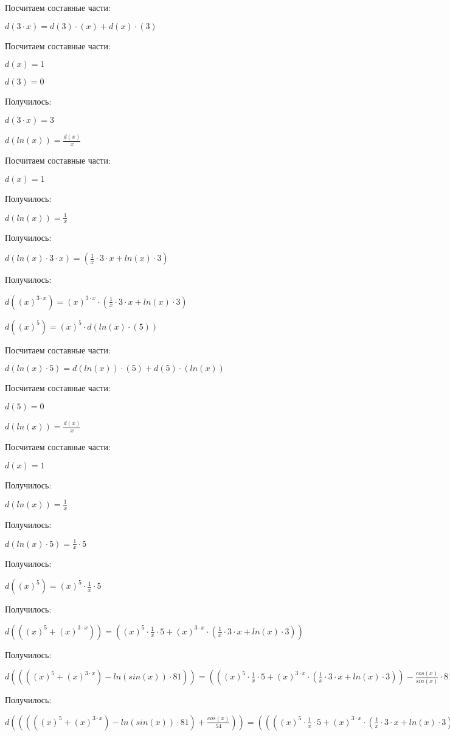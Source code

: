 Посчитаем составные части:

$ d(3 \cdot x) = d(3) \cdot (x) + d(x) \cdot (3)$

Посчитаем составные части:

$ d(x) = 1$

$ d(3) = 0$

Получилось:

$ d(3 \cdot x) = 3$

$ d(ln(x)) = \frac{d(x)}{x}$

Посчитаем составные части:

$ d(x) = 1$

Получилось:

$ d(ln(x)) = \frac{1}{x}$

Получилось:

$ d(ln(x) \cdot 3 \cdot x) = (\frac{1}{x} \cdot 3 \cdot x+ln(x) \cdot 3)$

Получилось:

$ d((x)^{3 \cdot x}) = (x)^{3 \cdot x} \cdot (\frac{1}{x} \cdot 3 \cdot x+ln(x) \cdot 3)$

$ d((x)^{5}) = (x)^{5} \cdot d(ln(x) \cdot (5))$

Посчитаем составные части:

$ d(ln(x) \cdot 5) = d(ln(x)) \cdot (5) + d(5) \cdot (ln(x))$

Посчитаем составные части:

$ d(5) = 0$

$ d(ln(x)) = \frac{d(x)}{x}$

Посчитаем составные части:

$ d(x) = 1$

Получилось:

$ d(ln(x)) = \frac{1}{x}$

Получилось:

$ d(ln(x) \cdot 5) = \frac{1}{x} \cdot 5$

Получилось:

$ d((x)^{5}) = (x)^{5} \cdot \frac{1}{x} \cdot 5$

Получилось:

$ d(((x)^{5}+(x)^{3 \cdot x})) = ((x)^{5} \cdot \frac{1}{x} \cdot 5+(x)^{3 \cdot x} \cdot (\frac{1}{x} \cdot 3 \cdot x+ln(x) \cdot 3))$

Получилось:

$ d((((x)^{5}+(x)^{3 \cdot x})-ln(sin(x)) \cdot 81)) = (((x)^{5} \cdot \frac{1}{x} \cdot 5+(x)^{3 \cdot x} \cdot (\frac{1}{x} \cdot 3 \cdot x+ln(x) \cdot 3))-\frac{cos(x)}{sin(x)} \cdot 81)$

Получилось:

$ d(((((x)^{5}+(x)^{3 \cdot x})-ln(sin(x)) \cdot 81)+\frac{cos(x)}{54})) = ((((x)^{5} \cdot \frac{1}{x} \cdot 5+(x)^{3 \cdot x} \cdot (\frac{1}{x} \cdot 3 \cdot x+ln(x) \cdot 3))-\frac{cos(x)}{sin(x)} \cdot 81)+\frac{-1 \cdot sin(x) \cdot 54}{2916})$

